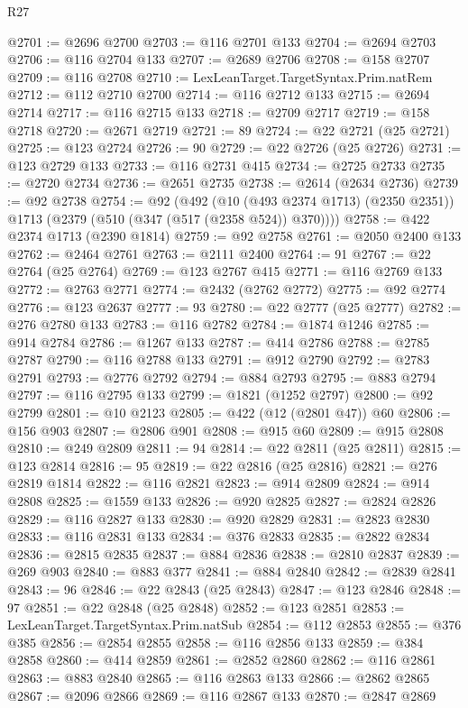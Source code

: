 \begin{lexlean}{R27}
\begin{coremodule}
@2701 := @2696 @2700
@2703 := @116 @2701 @133
@2704 := @2694 @2703
@2706 := @116 @2704 @133
@2707 := @2689 @2706
@2708 := @158 @2707
@2709 := @116 @2708
@2710 := LexLeanTarget.TargetSyntax.Prim.natRem
@2712 := @112 @2710 @2700
@2714 := @116 @2712 @133
@2715 := @2694 @2714
@2717 := @116 @2715 @133
@2718 := @2709 @2717
@2719 := @158 @2718
@2720 := @2671 @2719
@2721 := 89
@2724 := @22 @2721 (@25 @2721)
@2725 := @123 @2724
@2726 := 90
@2729 := @22 @2726 (@25 @2726)
@2731 := @123 @2729 @133
@2733 := @116 @2731 @415
@2734 := @2725 @2733
@2735 := @2720 @2734
@2736 := @2651 @2735
@2738 := @2614 (@2634 @2736)
@2739 := @92 @2738
@2754 := @92
    (@492
      (@10 (@493 @2374 @1713) (@2350 @2351))
      @1713
      (@2379 (@510 (@347 (@517 (@2358 @524)) @370))))
@2758 := @422 @2374 @1713 (@2390 @1814)
@2759 := @92 @2758
@2761 := @2050 @2400 @133
@2762 := @2464 @2761
@2763 := @2111 @2400
@2764 := 91
@2767 := @22 @2764 (@25 @2764)
@2769 := @123 @2767 @415
@2771 := @116 @2769 @133
@2772 := @2763 @2771
@2774 := @2432 (@2762 @2772)
@2775 := @92 @2774
@2776 := @123 @2637
@2777 := 93
@2780 := @22 @2777 (@25 @2777)
@2782 := @276 @2780 @133
@2783 := @116 @2782
@2784 := @1874 @1246
@2785 := @914 @2784
@2786 := @1267 @133
@2787 := @414 @2786
@2788 := @2785 @2787
@2790 := @116 @2788 @133
@2791 := @912 @2790
@2792 := @2783 @2791
@2793 := @2776 @2792
@2794 := @884 @2793
@2795 := @883 @2794
@2797 := @116 @2795 @133
@2799 := @1821 (@1252 @2797)
@2800 := @92 @2799
@2801 := @10 @2123
@2805 := @422 (@12 (@2801 @47)) @60
@2806 := @156 @903
@2807 := @2806 @901
@2808 := @915 @60
@2809 := @915 @2808
@2810 := @249 @2809
@2811 := 94
@2814 := @22 @2811 (@25 @2811)
@2815 := @123 @2814
@2816 := 95
@2819 := @22 @2816 (@25 @2816)
@2821 := @276 @2819 @1814
@2822 := @116 @2821
@2823 := @914 @2809
@2824 := @914 @2808
@2825 := @1559 @133
@2826 := @920 @2825
@2827 := @2824 @2826
@2829 := @116 @2827 @133
@2830 := @920 @2829
@2831 := @2823 @2830
@2833 := @116 @2831 @133
@2834 := @376 @2833
@2835 := @2822 @2834
@2836 := @2815 @2835
@2837 := @884 @2836
@2838 := @2810 @2837
@2839 := @269 @903
@2840 := @883 @377
@2841 := @884 @2840
@2842 := @2839 @2841
@2843 := 96
@2846 := @22 @2843 (@25 @2843)
@2847 := @123 @2846
@2848 := 97
@2851 := @22 @2848 (@25 @2848)
@2852 := @123 @2851
@2853 := LexLeanTarget.TargetSyntax.Prim.natSub
@2854 := @112 @2853
@2855 := @376 @385
@2856 := @2854 @2855
@2858 := @116 @2856 @133
@2859 := @384 @2858
@2860 := @414 @2859
@2861 := @2852 @2860
@2862 := @116 @2861
@2863 := @883 @2840
@2865 := @116 @2863 @133
@2866 := @2862 @2865
@2867 := @2096 @2866
@2869 := @116 @2867 @133
@2870 := @2847 @2869

\end{coremodule}
\end{lexlean}
